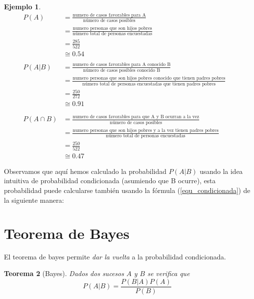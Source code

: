 \documentclass[]{book}
\theoremstyle{plain}
\newtheorem{theorem}{Teorema}[section]
\theoremstyle{definition}
\newtheorem{example}[theorem]{Ejemplo}
\theoremstyle{definition} %
\begin{document}
\begin{example}
  \begin{align*}
    P(A)&=\frac{\text{numero de casos favorables para A}}{\text{número de casos posibles}}\\
    &=\frac{\text{numero personas que son hijos pobres}}{\text{número total de personas encuestadas}}\\
    &=\frac{285}{522}\\
    &\cong 0.54
    &\\
    &\\
    P(A|B)&=\frac{\text{numero de casos favorables para A conocido B}}{\text{número de casos posibles conocido B}}\\
    &=\frac{\text{numero personas que son hijos pobres conocido que tienen padres pobres}}{\text{número total de personas encuestadas que tienen padres pobres}}\\
    &=\frac{250}{272}\\
    &\cong 0.91\\
    &\\
    &\\
    P(A\cap B)&=\frac{\text{numero de casos favorables para que A y B ocurran a la vez}}{\text{número de casos posibles}}\\
    &=\frac{\text{numero personas que son hijos pobres y a la vez tienen padres pobres}}{\text{número total de personas encuestadas}}\\
    &=\frac{250}{522}\\
    &\cong 0.47
  \end{align*}

  Observamos que aquí hemos calculado la probabilidad $P(A|B)$ usando la idea intuitiva de probabilidad condicionada (asumiendo que B ocurre), 
  esta probabilidad puede calcularse también usando la fórmula (\ref{equ_condicionada}) de la siguiente manera:

\end{example}



\hypertarget{teorema-de-bayes}{%
\section{Teorema de Bayes}\label{teorema-de-bayes}}

El teorema de bayes permite \emph{dar la vuelta} a la probabilidad
condicionada.

\begin{theorem}[Bayes]
  Dados dos sucesos \(A\) y \(B\) se verifica que 
  \[P(A|B) = \frac{P(B|A)P(A)}{P(B)}\]
\end{theorem}
 
\end{document}
